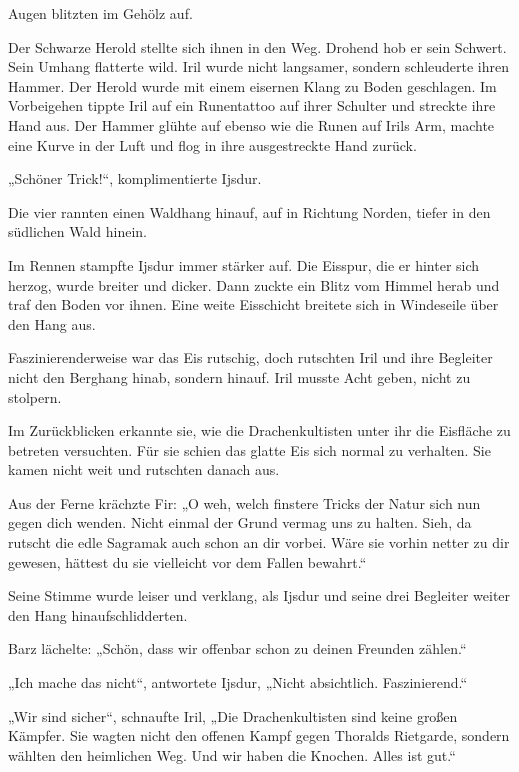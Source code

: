Augen blitzten im Gehölz auf.

Der Schwarze Herold stellte sich ihnen in den Weg. Drohend hob er sein Schwert. Sein Umhang flatterte wild. Iril wurde nicht langsamer, sondern schleuderte ihren Hammer. Der Herold wurde mit einem eisernen Klang zu Boden geschlagen. Im Vorbeigehen tippte Iril auf ein Runentattoo auf ihrer Schulter und streckte ihre Hand aus. Der Hammer glühte auf ebenso wie die Runen auf Irils Arm, machte eine Kurve in der Luft und flog in ihre ausgestreckte Hand zurück.

„Schöner Trick!“, komplimentierte Ijsdur.

Die vier rannten einen Waldhang hinauf, auf in Richtung Norden, tiefer in den südlichen Wald hinein.

Im Rennen stampfte Ijsdur immer stärker auf. Die Eisspur, die er hinter sich herzog, wurde breiter und dicker. Dann zuckte ein Blitz vom Himmel herab und traf den Boden vor ihnen. Eine weite Eisschicht breitete sich in Windeseile über den Hang aus.

Faszinierenderweise war das Eis rutschig, doch rutschten Iril und ihre Begleiter nicht den Berghang hinab, sondern hinauf. Iril musste Acht geben, nicht zu stolpern.

Im Zurückblicken erkannte sie, wie die Drachenkultisten unter ihr die Eisfläche zu betreten versuchten. Für sie schien das glatte Eis sich normal zu verhalten. Sie kamen nicht weit und rutschten danach aus.

Aus der Ferne krächzte Fir: „O weh, welch finstere Tricks der Natur sich nun gegen dich wenden. Nicht einmal der Grund vermag uns zu halten. Sieh, da rutscht die edle Sagramak auch schon an dir vorbei. Wäre sie vorhin netter zu dir gewesen, hättest du sie vielleicht vor dem Fallen bewahrt.“

Seine Stimme wurde leiser und verklang, als Ijsdur und seine drei Begleiter weiter den Hang hinaufschlidderten.

Barz lächelte: „Schön, dass wir offenbar schon zu deinen Freunden zählen.“

„Ich mache das nicht“, antwortete Ijsdur, „Nicht absichtlich. Faszinierend.“

„Wir sind sicher“, schnaufte Iril, „Die Drachenkultisten sind keine großen Kämpfer. Sie wagten nicht den offenen Kampf gegen Thoralds Rietgarde, sondern wählten den heimlichen Weg. Und wir haben die Knochen. Alles ist gut.“\bigskip







